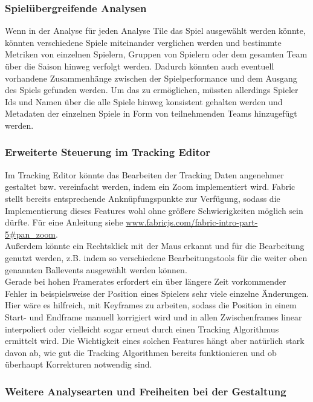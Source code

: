 \subsubsection{Spielübergreifende Analysen}

Wenn in der Analyse für jeden Analyse Tile das Spiel ausgewählt werden könnte, könnten verschiedene Spiele miteinander verglichen werden und bestimmte Metriken von einzelnen Spielern, Gruppen von Spielern oder dem gesamten Team über die Saison hinweg verfolgt werden. Dadurch könnten auch eventuell vorhandene Zusammenhänge zwischen der Spielperformance und dem Ausgang des Spiels gefunden werden. Um das zu ermöglichen, müssten allerdings Spieler Ids und Namen über die alle Spiele hinweg konsistent gehalten werden und Metadaten der einzelnen Spiele in Form von teilnehmenden Teams hinzugefügt werden.

\subsubsection{Erweiterte Steuerung im Tracking Editor}

Im Tracking Editor könnte das Bearbeiten der Tracking Daten angenehmer gestaltet bzw. vereinfacht werden, indem ein Zoom implementiert wird. Fabric stellt bereits entsprechende Anknüpfungspunkte zur Verfügung, sodass die Implementierung dieses Features wohl ohne größere Schwierigkeiten möglich sein dürfte. Für eine Anleitung siehe \url{www.fabricjs.com/fabric-intro-part-5#pan_zoom}.\\
Außerdem könnte ein Rechtsklick mit der Maus erkannt und für die Bearbeitung genutzt werden, z.B. indem so verschiedene Bearbeitungstools für die weiter oben genannten Ballevents ausgewählt werden können.\\
Gerade bei hohen Framerates erfordert ein über längere Zeit vorkommender Fehler in beispielsweise der Position eines Spielers sehr viele einzelne Änderungen. Hier wäre es hilfreich, mit Keyframes zu arbeiten, sodass die Position in einem Start- und Endframe manuell korrigiert wird und in allen Zwischenframes linear interpoliert oder vielleicht sogar erneut durch einen Tracking Algorithmus ermittelt wird. Die Wichtigkeit eines solchen Features hängt aber natürlich stark davon ab, wie gut die Tracking Algorithmen bereits funktionieren und ob überhaupt Korrekturen notwendig sind.

\subsubsection{Weitere Analysearten und Freiheiten bei der Gestaltung}

